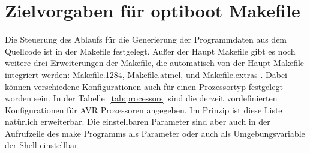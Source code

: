 \section{Zielvorgaben für optiboot Makefile}

Die Steuerung des Ablaufs für die Generierung der Programmdaten aus
dem Quellcode ist in der Makefile festgelegt.
Außer der  Haupt Makefile gibt es noch weitere drei Erweiterungen
der Makefile, die automatisch von der Haupt Makefile integriert werden:
Makefile.1284, Makefile.atmel, und Makefile.extras .
Dabei können verschiedene Konfigurationen auch für einen Prozessortyp
festgelegt worden sein. In der Tabelle~\ref{tab:processors} sind die derzeit vordefinierten
Konfigurationen für AVR Prozessoren angegeben. Im Prinzip ist diese Liste natürlich erweiterbar.
Die einstellbaren Parameter sind aber auch in der Aufrufzeile des
make Programms als Parameter oder auch als Umgebungsvariable der Shell
einstellbar.

